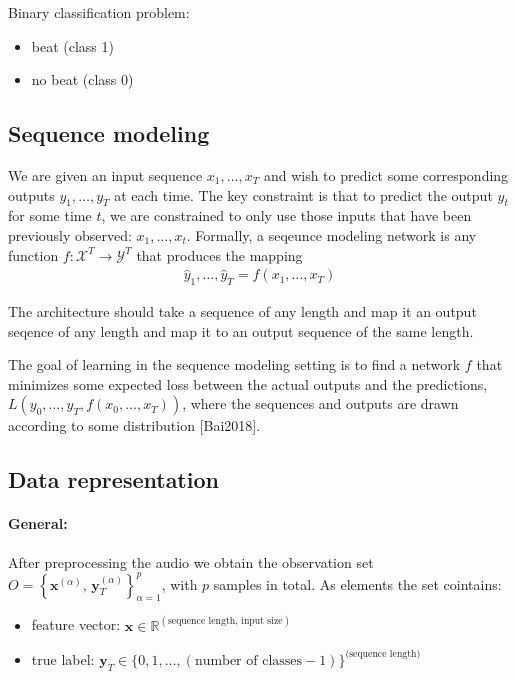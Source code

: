 \documentclass{article}
\begin{document}
Binary classification problem:
\begin{itemize}
\item beat (class 1)
\item no beat (class 0)
\end{itemize}


\subsection{Sequence modeling}

We are given an input sequence $x_1, \dots, x_T$ and wish to predict some corresponding outputs $y_1, \dots, y_T$ at each time. The key constraint is that to predict the output $y_t$ for some time $t$, we are constrained to only use those inputs that have been previously observed: $x_1, \dots , x_t$. Formally, a seqeunce modeling network is any function $f : \mathcal X^{T} \rightarrow \mathcal Y^{T}$ that produces the mapping
\begin{align}
\hat y_1, \dots, \hat y_T = f(x_1,\dots, x_T)
\end{align}

The architecture should take a sequence of any length and map it an output seqence of any length and map it to an output sequence of the same length.

The goal of learning in the sequence modeling setting is to find a network $f$ that minimizes some expected loss between the actual outputs and the predictions, $L(y_0,\dots,y_T, f(x_0,\dots,x_T))$, where the sequences and outputs are drawn according to some distribution [Bai2018].



\subsection{Data representation}

\paragraph{General:}

After preprocessing the audio we obtain the observation set $ O = \left\{ \mathbf x^{(\alpha)}, \,\mathbf y_T^{(\alpha)} \right \}_{\alpha = 1}^p$, with $p$ samples in total. As elements the set cointains:
\begin{itemize}
\item feature vector: $\mathbf x \in \mathbb R^{(\text{sequence length}, \,\text{input size})}$
\item true label: $\mathbf y_T \in \{0,1, \dots, (\text{number of classes}-1)\}^{\text{(sequence length)}}$
\end{itemize}
\end{document}
